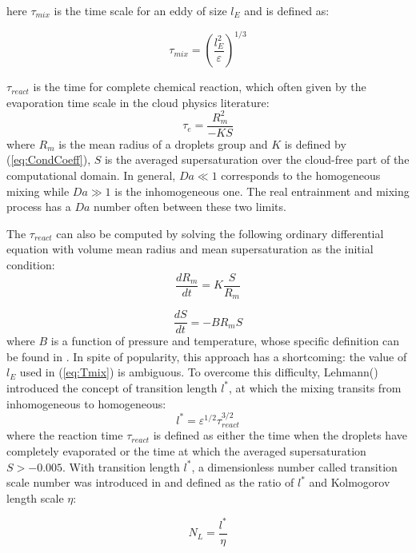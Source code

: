 \documentclass[draft,jgrga]{AGUTeX}
\begin{document}
\begin{article}
here $\tau_{mix}$ is the time scale for an eddy of size $l_E$ and is defined as:

\begin{equation}
\tau_{mix}=(\frac{l_E^{2}}{\varepsilon})^{1/3}\label{eq:Tmix}
\end{equation}

$\tau_{react}$ is the time for complete chemical reaction, which often given by the evaporation time scale in the cloud physics literature:
\begin{equation}
\tau_{e}=\frac{R_{m}^{2}}{-KS}\label{eq:Tevap}
\end{equation}
where $R_{m}$ is the mean radius of a droplets group and $K$ is defined
by (\ref{eq:CondCoeff}), $S$ is the averaged supersaturation over
the cloud-free part of the computational domain. In general, $Da\ll1$ corresponds to the homogeneous mixing while $Da\gg1$ is the inhomogeneous one. The real entrainment and mixing process has a $Da$ number often between
these two limits.

The $\tau_{react}$ can also be computed by solving the following ordinary differential equation with volume mean radius and mean supersaturation as the initial condition:
\begin{equation}
\frac{dR_{m}}{dt}=K\frac{S}{R_{m}}\label{eq:DiffR}
\end{equation}

\begin{equation}
\frac{dS}{dt}=-BR_{m}S\label{eq:DiffSuper}
\end{equation}
where $B$ is a function of pressure and temperature, whose specific definition can be found in \cite{Chunsong11}. In spite of popularity, this approach has a shortcoming:
the value of $l_E$ used in (\ref{eq:Tmix}) is ambiguous. To overcome this difficulty, Lehmann(\cite{Lehmann09}) introduced the concept of transition length $l^{*}$, at which the mixing transits from inhomogeneous to homogeneous:
\begin{equation}
l^{*}=\varepsilon^{1/2}\tau_{react}^{3/2}\label{eq:TransL}
\end{equation}
where the reaction time $\tau_{react}$ is defined as either the time when the droplets have completely evaporated or the time at which the averaged supersaturation $S>-0.005$. 
With transition length $l^{*}$, a dimensionless number called transition scale number was introduced in \cite{Chunsong13} and defined as the ratio of $l^{*}$ and Kolmogorov length scale $\eta$:

\begin{equation}
N_{L}=\frac{l^{*}}{\eta}\label{eq:NL}
\end{equation}


\end{article}
\end{document}
